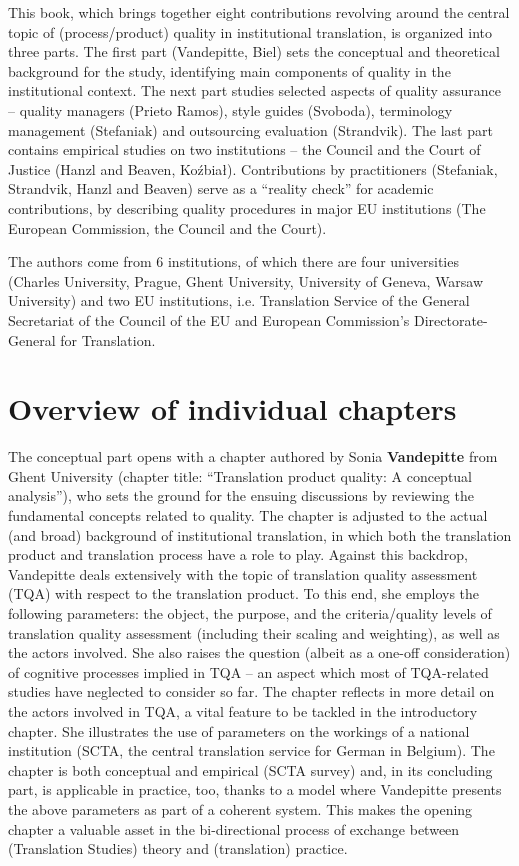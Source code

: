 \documentclass[output=paper]{langsci/langscibook}
\begin{document}
This book, which brings together eight contributions revolving around the central topic of (process/product) quality in institutional translation, is organized into three parts. The first part (Vandepitte, Biel) sets the conceptual and theoretical background for the study, identifying main components of quality in the institutional context. The next part studies selected aspects of quality assurance – quality managers (Prieto Ramos), style guides (Svoboda), terminology management (Stefaniak) and outsourcing evaluation (Strandvik). The last part contains empirical studies on two institutions – the Council and the Court of Justice (Hanzl and Beaven, Koźbiał). Contributions by practitioners (Stefaniak, Strandvik, Hanzl and Beaven) serve as a “reality check” for academic contributions, by describing quality procedures in major EU institutions (The European Commission, the Council and the Court). 

The authors come from 6 institutions, of which there are four universities (Charles University, Prague, Ghent University, University of Geneva, Warsaw University) and two EU institutions, i.e. Translation Service of the General Secretariat of the Council of the EU and European Commission’s Directorate-General for Translation.

\section{Overview of individual chapters}

The conceptual part opens with a chapter authored by Sonia \textbf{Vandepitte} from Ghent University (chapter title: “Translation product quality: A conceptual analysis”), who sets the ground for the ensuing discussions by reviewing the fundamental concepts related to quality. The chapter is adjusted to the actual (and broad) background of institutional translation, in which both the translation product and translation process have a role to play. Against this backdrop, Vandepitte deals extensively with the topic of translation quality assessment (TQA) with respect to the translation product. To this end, she employs the following parameters: the object, the purpose, and the criteria/quality levels of translation quality assessment (including their scaling and weighting), as well as the actors involved. She also raises the question (albeit as a one-off consideration) of cognitive processes implied in TQA – an aspect which most of TQA-related studies have neglected to consider so far. The chapter reflects in more detail on the actors involved in TQA, a vital feature to be tackled in the introductory chapter. She illustrates the use of parameters on the workings of a national institution (SCTA, the central translation service for German in Belgium). The chapter is both conceptual and empirical (SCTA survey) and, in its concluding part, is applicable in practice, too, thanks to a model where Vandepitte presents the above parameters as part of a coherent system. This makes the opening chapter a valuable asset in the bi-directional process of exchange between (Translation Studies) theory and (translation) practice.
\end{document}
